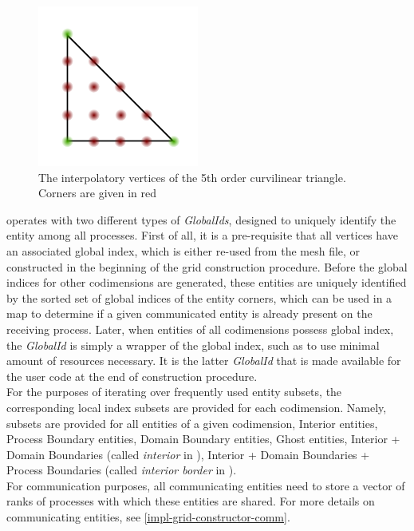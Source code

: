 \begin{figure}
    \centering
	\includegraphics[scale=1.5]{images/vertex-vs-corner}
	\caption{The interpolatory vertices of the 5th order curvilinear triangle. Corners are given in red}
	\label{fig:impl:storage:vertexvscorner}
\end{figure}

\noindent
\curvgrid{} operates with two different types of \textit{GlobalIds}, designed to uniquely identify the entity among all processes. First of all, it is a pre-requisite that all vertices have an associated global index, which is either re-used from the mesh file, or constructed in the beginning of the grid construction procedure. Before the global indices for other codimensions are generated, these entities are uniquely identified by the sorted set of global indices of the entity corners, which can be used in a map to determine if a given communicated entity is already present on the receiving process. Later, when entities of all codimensions possess global index, the \textit{GlobalId} is simply a wrapper of the global index, such as to use minimal amount of resources necessary. It is the latter \textit{GlobalId} that is made available for the user code at the end of construction procedure. \\

\noindent
For the purposes of iterating over frequently used entity subsets, the corresponding local index subsets are provided for each codimension. Namely, subsets are provided for all entities of a given codimension, Interior entities, Process Boundary entities, Domain Boundary entities, Ghost entities, Interior + Domain Boundaries (called \textit{interior} in \dune{}), Interior + Domain Boundaries + Process Boundaries (called \textit{interior border} in \dune{}). \\

\noindent
For communication purposes, all communicating entities need to store a vector of ranks of processes with which these entities are shared. For more details on communicating entities, see \cref{impl-grid-constructor-comm}.




